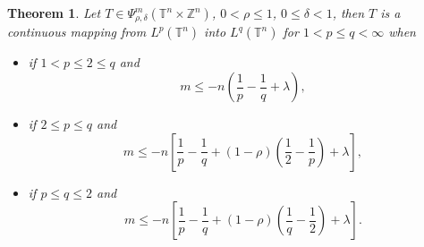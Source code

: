 \documentclass[12pt, reqno]{amsart}
\newtheorem{theorem}{Theorem}[section]
\theoremstyle{definition}
\theoremstyle{remark}
\numberwithin{equation}{section}
\begin{document}
\begin{theorem}
    Let $T \in \Psi^m_{\rho, \delta}(\mathbb{T}^n \times \mathbb{Z}^n) $, $0 < \rho \leq 1$, $0 \leq \delta < 1$, then $T$  is a continuous mapping from $L^p(\mathbb{T}^n)$ into $L^q(\mathbb{T}^n)$ for $1<p\leq q<\infty$ when 
    \begin{itemize}
        \item[(a)] if $1<p\leq 2\leq q$ and 
        \begin{equation}
            m\leq -n \left( \frac{1}{p} - \frac{1}{q} + \lambda \right),
            \label{eq:Lp-Lq-bounds-a}
        \end{equation}
        \item[(b)] if $2\leq p \leq q$ and 
        \begin{equation}
            m \leq -n \left[ \frac{1}{p} - \frac{1}{q} + (1-\rho)\left(\frac{1}{2} - \frac{1}{p}\right) + \lambda \right],
            \label{eq:Lp-Lq-bounds-b}
        \end{equation}
     
        \item[(c)] if $p\leq q\leq 2$ and  
        \begin{equation}
            m \leq -n \left[ \frac{1}{p} - \frac{1}{q} + (1-\rho)\left(\frac{1}{q} - \frac{1}{2}\right) + \lambda \right].
            \label{eq:Lp-Lq-bounds-c}
        \end{equation}
    \end{itemize}
    \label{theo:Lp-Lq-bounds}
\end{theorem}
\end{document}
